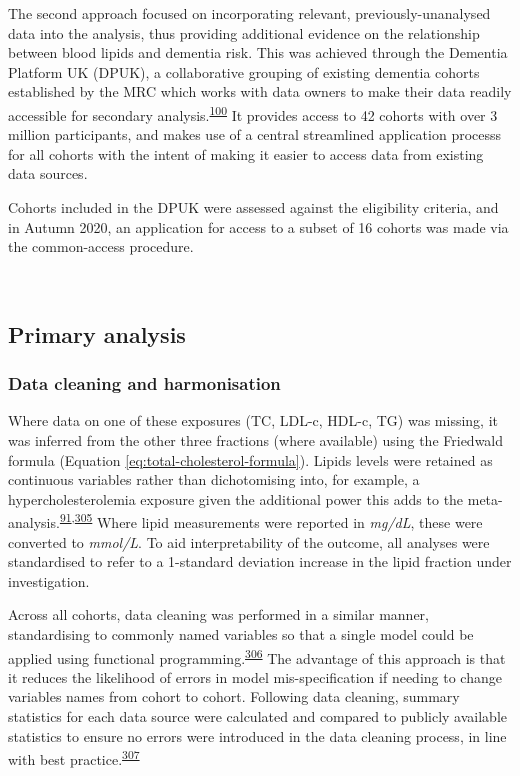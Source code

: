 \documentclass[a4paper, twoside]{templates/ociamthesis}
\begin{document}
The second approach focused on incorporating relevant, previously-unanalysed data into the analysis, thus providing additional evidence on the relationship between blood lipids and dementia risk. This was achieved through the Dementia Platform UK (DPUK), a collaborative grouping of existing dementia cohorts established by the MRC which works with data owners to make their data readily accessible for secondary analysis.\textsuperscript{\protect\hyperlink{ref-bauermeister2020}{100}} It provides access to 42 cohorts with over 3 million participants, and makes use of a central streamlined application processs for all cohorts with the intent of making it easier to access data from existing data sources.

Cohorts included in the DPUK were assessed against the eligibility criteria, and in Autumn 2020, an application for access to a subset of 16 cohorts was made via the common-access procedure.

~

\hypertarget{primary-analysis-1}{%
\subsection{Primary analysis}\label{primary-analysis-1}}

\hypertarget{data-cleaning-and-harmonisation}{%
\subsubsection{Data cleaning and harmonisation}\label{data-cleaning-and-harmonisation}}

Where data on one of these exposures (TC, LDL-c, HDL-c, TG) was missing, it was inferred from the other three fractions (where available) using the Friedwald formula (Equation \eqref{eq:total-cholesterol-formula}). Lipids levels were retained as continuous variables rather than dichotomising into, for example, a hypercholesterolemia exposure given the additional power this adds to the meta-analysis.\textsuperscript{\protect\hyperlink{ref-riley2020}{91},\protect\hyperlink{ref-ensor2018}{305}} Where lipid measurements were reported in \emph{mg/dL}, these were converted to \emph{mmol/L}. To aid interpretability of the outcome, all analyses were standardised to refer to a 1-standard deviation increase in the lipid fraction under investigation.

Across all cohorts, data cleaning was performed in a similar manner, standardising to commonly named variables so that a single model could be applied using functional programming.\textsuperscript{\protect\hyperlink{ref-wickham2016a}{306}} The advantage of this approach is that it reduces the likelihood of errors in model mis-specification if needing to change variables names from cohort to cohort. Following data cleaning, summary statistics for each data source were calculated and compared to publicly available statistics to ensure no errors were introduced in the data cleaning process, in line with best practice.\textsuperscript{\protect\hyperlink{ref-levis2021}{307}}
\end{document}
